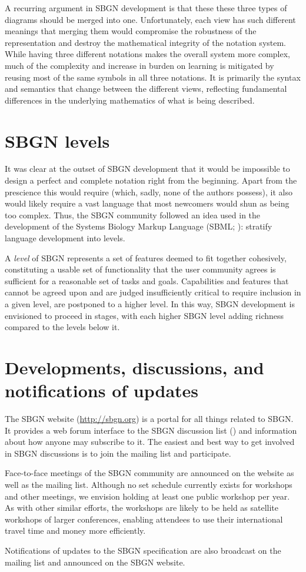 A recurring argument in SBGN development is that these these three types of diagrams should be merged into one.  Unfortunately, each view has such different meanings that merging them would compromise the robustness of the representation and destroy the mathematical integrity of the notation system.  While having three different notations makes the overall system more complex, much of the complexity and increase in burden on learning is mitigated by reusing most of the same symbols in all three notations.  It is primarily the syntax and semantics that change between the different views, reflecting fundamental differences in the underlying mathematics of what is being described.

\section{SBGN levels}
\label{sec:sbgn-levels}

It was clear at the outset of SBGN development that it would be impossible to design a perfect and complete notation right from the beginning.  Apart from the prescience this would require (which, sadly, none of the authors possess), it also would likely require a vast language that most newcomers would shun as being too complex.  Thus, the SBGN community followed an idea used in the development of the Systems Biology Markup Language (SBML; \cite{Hucka:2003}): stratify language development into levels.

A \emph{level} of SBGN represents a set of features deemed to fit together cohesively, constituting a usable set of functionality that the user community agrees is sufficient for a reasonable set of tasks and goals.  Capabilities and features that cannot be agreed upon and are judged insufficiently critical to require inclusion in a given level, are postponed to a higher level.  In this way, SBGN development is envisioned to proceed in stages, with each higher SBGN level adding richness compared to the levels below it.

\section{Developments, discussions, and notifications of updates}
\label{sec:discussions}

The SBGN website (\url{http://sbgn.org}) is a portal for all things related to SBGN.  It provides a web forum interface to the SBGN discussion list () and information about how anyone may subscribe to it.  The easiest and best way to get involved in SBGN discussions is to join the mailing list and participate.

Face-to-face meetings of the SBGN community are announced on the website as well as the mailing list.  Although no set schedule currently exists for workshops and other meetings, we envision holding at least one public workshop per year.  As with other similar efforts, the workshops are likely to be held as satellite workshops of larger conferences, enabling attendees to use their international travel time and money more efficiently.

Notifications of updates to the SBGN specification are also broadcast on the mailing list and announced on the SBGN website.
